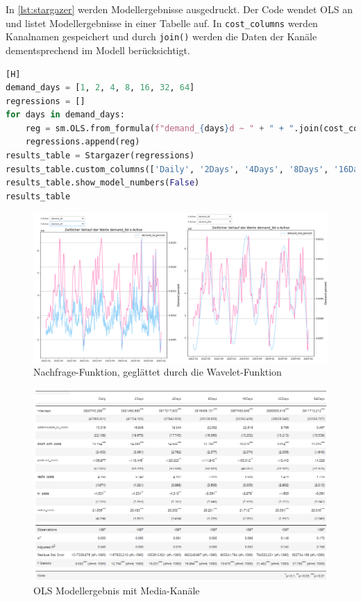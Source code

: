 In \autoref{lst:stargazer} werden Modellergebnisse ausgedruckt. Der Code wendet \ac{OLS} an und listet Modellergebnisse in einer Tabelle auf. In \verb|cost_columns| werden Kanalnamen gespeichert und durch \verb|join()| werden die Daten der Kanäle dementsprechend im Modell berücksichtigt. 
\begin{lstlisting}[language=Python, linewidth=\textwidth][H]
demand_days = [1, 2, 4, 8, 16, 32, 64]
regressions = []
for days in demand_days:
    reg = sm.OLS.from_formula(f"demand_{days}d ~ " + " + ".join(cost_columns), df_wlt_decomp).fit()
    regressions.append(reg)
results_table = Stargazer(regressions)
results_table.custom_columns(['Daily', '2Days', '4Days', '8Days', '16Days', '32Days', '64Days'], [1, 1, 1, 1, 1, 1, 1])
results_table.show_model_numbers(False)
results_table
\end{lstlisting}
\label{lst:stargazer}
\begin{figure}[H]
    \centering
    \includegraphics[width=1\linewidth]{images/wavelet.png}
    \caption{Nachfrage-Funktion, geglättet durch die Wavelet-Funktion}
    \label{fig:wavelet}
\end{figure}
\begin{figure}
    \centering
    \includegraphics[width=1\linewidth]{images/ols1.png}
    \caption{\ac{OLS} Modellergebnis mit Media-Kanäle}
    \label{fig:ols1}
\end{figure}
